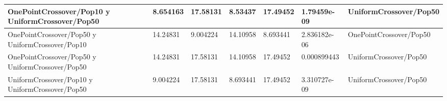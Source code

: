 \begin{table}
{\begin{tabular}{lllllll}
    OnePointCrossover/Pop10 y UniformCrossover/Pop50                    & 8.654163              & 17.58131              & 8.53437               & 17.49452              & 1.79459e-09                                           & UniformCrossover/Pop50                                \\ \hline
    OnePointCrossover/Pop50 y UniformCrossover/Pop10                    & 14.24831              & 9.004224              & 14.10958              & 8.693441              & 2.836182e-06                                          & OnePointCrossover/Pop50                               \\ \hline
    OnePointCrossover/Pop50 y UniformCrossover/Pop50                    & 14.24831              & 17.58131              & 14.10958              & 17.49452              & 0.000899443                                           & UniformCrossover/Pop50                                \\ \hline
    UniformCrossover/Pop10 y UniformCrossover/Pop50                     & 9.004224              & 17.58131              & 8.693441              & 17.49452              & 3.310727e-09                                          & UniformCrossover/Pop50                                \\ \hline
    \end{tabular}}
\end{table}



